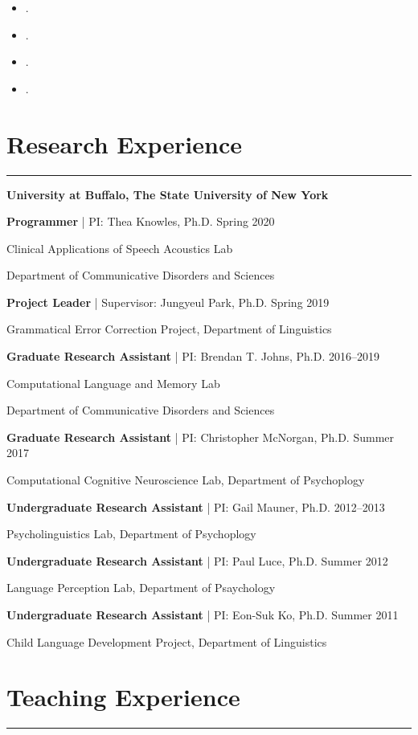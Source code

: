 \documentclass[11pt]{article}
\newcommand{\cvsection}[1]{\vspace{-0.2cm}\section*{\Large #1}\vspace{-0.2cm}\hrule\vspace{0.2cm}}
\begin{document}
\begin{itemize}[leftmargin=!,labelindent=!,itemindent=-15pt]
    \setlength\itemsep{0.3em}

    \item[] .
    \item[] .
    \item[] .
    \item[] .

\end{itemize}


\cvsection{Research Experience}

\textbf{University at Buffalo, The State University of New York}

\textbf{Programmer} | PI: Thea Knowles, Ph.D. \hfill Spring 2020

\quad Clinical Applications of Speech Acoustics Lab

\quad Department of Communicative Disorders and Sciences

\textbf{Project Leader} | Supervisor: Jungyeul Park, Ph.D. \hfill Spring 2019

\quad Grammatical Error Correction Project, Department of Linguistics

\textbf{Graduate Research Assistant} | PI: Brendan T. Johns, Ph.D. \hfill 2016--2019

\quad Computational Language and Memory Lab

\quad Department of Communicative Disorders and Sciences

\textbf{Graduate Research Assistant} | PI: Christopher McNorgan, Ph.D. \hfill Summer 2017

\quad Computational Cognitive Neuroscience Lab, Department of Psychoplogy

\textbf{Undergraduate Research Assistant} | PI: Gail Mauner, Ph.D. \hfill 2012--2013

\quad Psycholinguistics Lab, Department of Psychoplogy

\textbf{Undergraduate Research Assistant} | PI: Paul Luce, Ph.D. \hfill Summer 2012

\quad Language Perception Lab, Department of Psaychology

\textbf{Undergraduate Research Assistant} | PI: Eon-Suk Ko, Ph.D. \hfill Summer 2011

\quad Child Language Development Project, Department of Linguistics


\cvsection{Teaching Experience}
\end{document}
